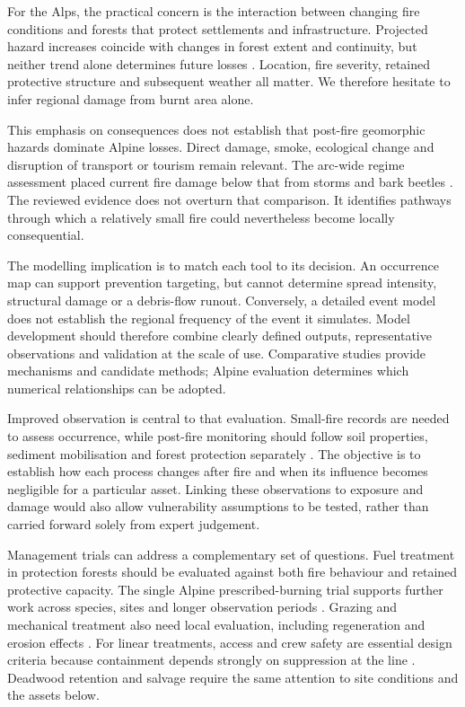 \documentclass[11pt,a4paper]{article}
\begin{document}
For the Alps, the practical concern is the interaction between changing fire conditions and forests that protect settlements and infrastructure. Projected hazard increases coincide with changes in forest extent and continuity, but neither trend alone determines future losses \citep{gerberding_mapping_2025, garbarino_contrasting_2020}. Location, fire severity, retained protective structure and subsequent weather all matter. We therefore hesitate to infer regional damage from burnt area alone.

This emphasis on consequences does not establish that post-fire geomorphic hazards dominate Alpine losses. Direct damage, smoke, ecological change and disruption of transport or tourism remain relevant. The arc-wide regime assessment placed current fire damage below that from storms and bark beetles \citep{conedera_characterizing_2018}. The reviewed evidence does not overturn that comparison. It identifies pathways through which a relatively small fire could nevertheless become locally consequential.

The modelling implication is to match each tool to its decision. An occurrence map can support prevention targeting, but cannot determine spread intensity, structural damage or a debris-flow runout. Conversely, a detailed event model does not establish the regional frequency of the event it simulates. Model development should therefore combine clearly defined outputs, representative observations and validation at the scale of use. Comparative studies provide mechanisms and candidate methods; Alpine evaluation determines which numerical relationships can be adopted.

Improved observation is central to that evaluation. Small-fire records are needed to assess occurrence, while post-fire monitoring should follow soil properties, sediment mobilisation and forest protection separately \citep{melzner_wildfire-induced_2025, baselt_compound_2026}. The objective is to establish how each process changes after fire and when its influence becomes negligible for a particular asset. Linking these observations to exposure and damage would also allow vulnerability assumptions to be tested, rather than carried forward solely from expert judgement.

Management trials can address a complementary set of questions. Fuel treatment in protection forests should be evaluated against both fire behaviour and retained protective capacity. The single Alpine prescribed-burning trial supports further work across species, sites and longer observation periods \citep{gamba_prescribed_2025}. Grazing and mechanical treatment also need local evaluation, including regeneration and erosion effects \citep{rouetleduc_effects_2021, xu_how_2026}. For linear treatments, access and crew safety are essential design criteria because containment depends strongly on suppression at the line \citep{ortega_modeling_2024}. Deadwood retention and salvage require the same attention to site conditions and the assets below.
\end{document}
